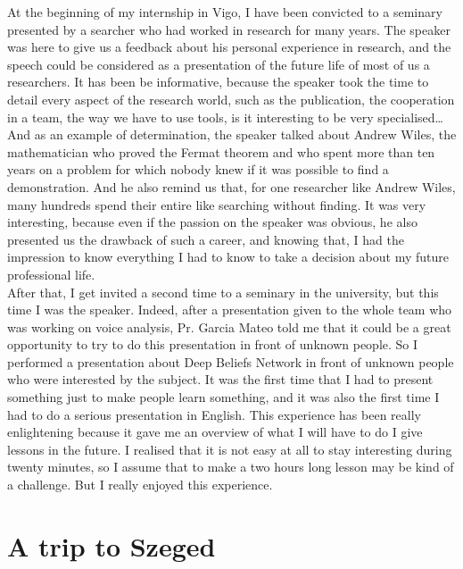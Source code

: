 \documentclass{report}
\begin{document}
	At the beginning of my internship in Vigo, I have been convicted to a seminary presented by a searcher who had worked in research for many years. The speaker was here to give us a feedback about his personal experience in research, and the speech could be considered as a presentation of the future life of most of us a researchers. It has been be informative, because the speaker took the time to detail every aspect of the research world, such as the publication, the cooperation in a team, the way we have to use tools, is it interesting to be very specialised… And as an example of determination, the speaker talked about Andrew Wiles, the mathematician who proved the Fermat theorem and who spent more than ten years on a problem for which nobody knew if it was possible to find a demonstration. And he also remind us that, for one researcher like Andrew Wiles, many hundreds spend their entire like searching without finding. It was very interesting, because even if the passion on the speaker was obvious, he also presented us the drawback of such a career, and knowing that, I had the impression to know everything I had to know to take a decision about my future professional life.\\
	
	After that, I get invited a second time to a seminary in the university, but this time I was the speaker.  Indeed, after a presentation given to the whole team who was working on voice analysis, Pr. Garcia Mateo told me that it could be a great opportunity to try to do this presentation in front of unknown people. So I performed a presentation about Deep Beliefs Network in front of unknown people who were interested by the subject. It was the first time that I had to present something just to make people learn something, and it was also the first time I had to do a serious presentation in English. This experience has been really enlightening because it gave me an overview of what I will have to do I give lessons in the future. I realised that it is not easy at all to stay interesting during twenty minutes, so I assume that to make a two hours long lesson may be kind of a challenge. But I really enjoyed this experience.
	
	\section{A trip to Szeged}
	
\end{document}
